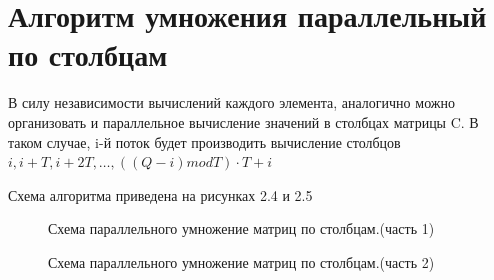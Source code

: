 \documentclass[12pt,a4paper]{report}
\begin{document}
\newpage
\section{Алгоритм умножения параллельный по столбцам}

В силу независимости вычислений каждого элемента, аналогично можно организовать и параллельное вычисление
значений в столбцах матрицы C. В таком случае, i-й поток будет производить вычисление столбцов
$i, i + T, i + 2T, \dots, ((Q - i) mod T) \cdot T + i$

Схема алгоритма приведена на рисунках 2.4 и 2.5


\begin{figure}[ht!]
	\caption{Схема параллельного умножение матриц по столбцам.(часть 1)}
\end{figure}

\begin{figure}[ht!]
	\caption{Схема параллельного умножение матриц по столбцам.(часть 2)}
\end{figure}
\end{document}
